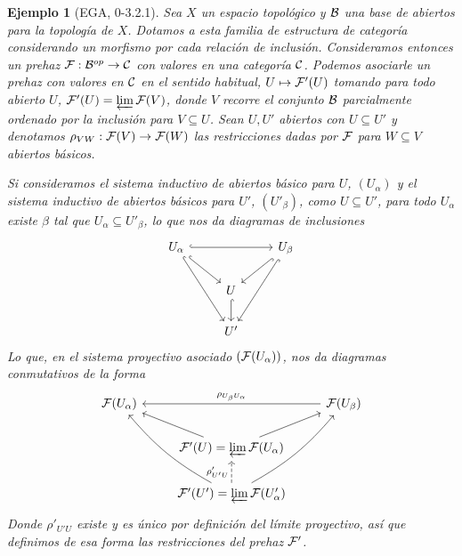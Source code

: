 \documentclass[twoside]{article}
\newtheorem{eje}[defin]{Ejemplo}
\begin{document}
\begin{eje}[EGA, 0-3.2.1]\label{prehaztop}%
Sea $X$ un espacio topológico y ${\mathcal B}$ una base de abiertos para la topología de $X$. Dotamos a esta familia de estructura de categoría considerando un morfismo por cada relación de inclusión. Consideramos entonces un prehaz $\mathcal{F}:{\mathcal B}^{op}\to{\mathcal C}$ con valores en una categoría ${\mathcal C}$. Podemos asociarle un prehaz con valores en ${\mathcal C}$ en el sentido habitual, $U\mapsto \mathcal{F}'(U)$ tomando para todo abierto $U$, $\mathcal{F}'(U)=\varprojlim\mathcal{F}(V)$, donde $V$ recorre el conjunto ${\mathcal B}$ parcialmente ordenado por la inclusión para $V\subseteq U$. Sean $U,U'$ abiertos con $U\subseteq U'$ y denotamos $\rho_{VW}:\mathcal{F}(V)\to\mathcal{F}(W)$ las restricciones dadas por $\mathcal{F}$ para $W\subseteq V$ abiertos básicos.

Si consideramos el sistema inductivo de abiertos básico para $U$, $(U_\alpha)$ y el sistema inductivo de abiertos básicos para $U'$, $(U'_\beta)$, como $U\subseteq U'$, para todo $U_\alpha$ existe $\beta$ tal que $U_\alpha\subseteq U'_\beta$, lo que nos da diagramas de inclusiones %
\[
\begin{tikzcd}
U_\alpha\arrow[rr, hookrightarrow]\arrow[ddr, hookrightarrow]\arrow[dr, hookrightarrow]& & U_\beta\arrow[dl, hookrightarrow]\arrow[ddl,hookrightarrow]\\
& U\arrow[d, hookrightarrow]& \\
& U' &
\end{tikzcd}
\]
Lo que, en el sistema proyectivo asociado $(\mathcal{F}(U_\alpha))$, nos da diagramas conmutativos de la forma
\[
\begin{tikzcd}
\calF(U_\alpha)& & \calF(U_\beta)\arrow[ll, "\rho_{U_\beta U_\alpha}"']\\
& \calF'(U)=\varprojlim\calF(U_\alpha)\arrow[ur]\arrow[ul]& \\
& \calF'(U')=\varprojlim\calF(U'_\alpha)\arrow[u, dashed, "\rho'_{U'U}"]\arrow[uul,bend left=10] \arrow[uur,bend right=10]&
\end{tikzcd}
\]
Donde $\rho'_{U'U}$ existe y es único por definición del límite proyectivo, así que definimos de esa forma las restricciones del prehaz $\mathcal{F}'$.%

\end{eje}
\end{document}
